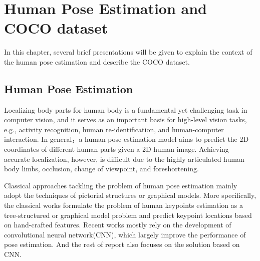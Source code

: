 \chapter{Human Pose Estimation and COCO dataset}
\label{sec:intro}
In this chapter, several brief presentations will be given to explain the context of the human pose estimation and describe the COCO dataset.

\section{Human Pose Estimation}
\label{sec:isauriam}
Localizing body parts for human body is a fundamental yet challenging task in computer vision, and it serves as an important basis for high-level vision tasks, e.g., activity
recognition\cite{yang2010recognizing, wang2013approach}, human re-identification\cite{zheng2017pose}, and human-computer interaction.
In general，a human pose estimation model aims to predict the 2D coordinates of different human parts given a 2D human image.
Achieving accurate localization, however, is difficult due to the highly articulated human body limbs, occlusion, change of viewpoint, and foreshortening.

Classical approaches tackling the problem of human pose estimation mainly adopt the techniques of pictorial structures \cite{fischler1973representation} or graphical models\cite{chen2014articulated}.
More specifically, the classical works\cite{andriluka2009pictorial, gkioxari2013articulated, sapp2013modec, johnson2011learning} formulate the problem of human keypoints estimation as a tree-structured or graphical model problem and predict keypoint locations based on hand-crafted features.
Recent works\cite{newell2016stacked, gkioxari2016chained, wei2016convolutional, insafutdinov2016deepercut} mostly rely on the development of convolutional neural network(CNN)\cite{lecun1998gradient, he2016deep}, which largely improve the performance of pose estimation.
And the rest of report also focuses on the solution based on CNN.

